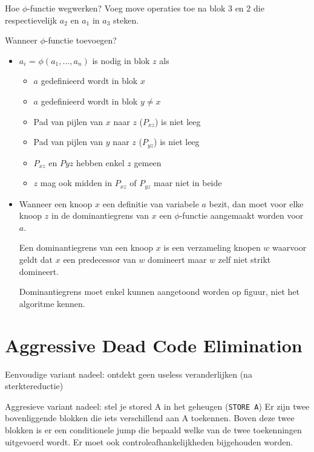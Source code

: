 Hoe $\phi$-functie wegwerken? Voeg move operaties toe na blok 3 en 2 die respectievelijk $a_2$ en $a_1$ in $a_3$ steken.

Wanneer $\phi$-functie toevoegen?
\begin{itemize}
	\item $a_i$ = $\phi(a_1, ..., a_n)$ is nodig in blok $z$ als
	\begin{itemize}
		\item $a$ gedefinieerd wordt in blok $x$
		\item $a$ gedefinieerd wordt in blok $y \neq x$
		\item Pad van pijlen van $x$ naar $z$ ($P_{xz}$) is niet leeg
		\item Pad van pijlen van $y$ naar $z$ ($P_{yz}$) is niet leeg	
		\item $P_{xz}$ en $P{yz}$ hebben enkel $z$ gemeen
		\item $z$ mag ook midden in $P_{xz}$ of $P_{yz}$ maar niet in beide
		
	\end{itemize}
	\item Wanneer een knoop $x$ een definitie van variabele $a$ bezit, dan moet voor elke knoop $z$ in de dominantiegrens van $x$ een $\phi$-functie aangemaakt worden voor $a$. 

	Een dominantiegrens van een knoop $x$ is een verzameling knopen $w$ waarvoor geldt dat $x$ een predecessor van $w$ domineert maar $w$ zelf niet strikt domineert.
	
	
	Dominantiegrens moet enkel kunnen aangetoond worden op figuur, niet het algoritme kennen.
\end{itemize}




\section{Aggressive Dead Code Elimination}
Eenvoudige variant nadeel: ontdekt geen useless veranderlijken (na sterktereductie)

Aggresieve variant nadeel: stel je stored A in het geheugen (\texttt{STORE A}) Er zijn twee bovenliggende blokken die iets verschillend aan A toekennen. Boven deze twee blokken is er een conditionele jump die bepaald welke van de twee toekenningen uitgevoerd wordt. Er moet ook controleafhankelijkheden bijgehouden worden.
